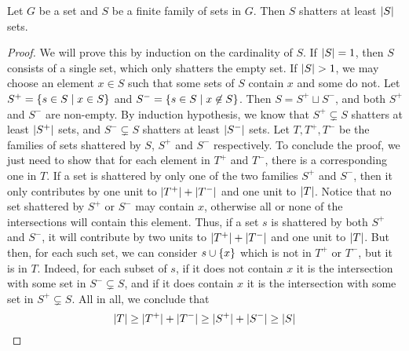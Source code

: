         \begin{lemma} \label{lem:pajor}
            Let $G$ be a set and $S$ be a finite family of sets in $G$.
            Then $S$ shatters at least $| S |$ sets.
            \begin{proof}
                We will prove this by induction on the cardinality of $S$.
                If $| S | = 1$, then $S$ consists of a single set, which only shatters the empty set.
                If $| S | > 1$, we may choose an element $x \in S$ such that some sets of $S$ contain $x$ and some do not.
                Let $S^+ = \{ s \in S \mid x \in S \}$ and $S^- = \{ s \in S \mid x \not\in S \}$.
                Then $S = S^+ \sqcup S^-$, and both $S^+$ and $S^-$ are non-empty.
                By induction hypothesis, we know that $S^+ \subsetneq S$ shatters at least $| S^+ |$ sets,
                and $S^- \subsetneq S$ shatters at least $| S^- |$ sets.
                Let $T, T^+, T^-$ be the families of sets shattered by $S$, $S^+$ and $S^-$ respectively.
                To conclude the proof, we just need to show that for each element in $T^+$ and $T^-$, there is a corresponding
                one in $T$.
                If a set is shattered by only one of the two families $S^+$ and $S^-$, then it only contributes by one unit
                to $| T^+ | + | T^- |$ and one unit to $| T |$.
                Notice that no set shattered by $S^+$ or $S^-$ may contain $x$, otherwise all or none of the intersections
                will contain this element.
                Thus, if a set $s$ is shattered by both $S^+$ and $S^-$, it will contribute by two units to
                $| T^+ | + | T^- |$ and one unit to $| T |$.
                But then, for each such set, we can consider $s \cup \{ x \}$ which is not in $T^+$ or $T^-$, but it is in $T$.
                Indeed, for each subset of $s$, if it does not contain $x$ it is the intersection with some
                set in $S^- \subsetneq S$, and if it does contain $x$ it is the intersection with some set in $S^+ \subsetneq S$.
                All in all, we conclude that
                \[
                    | T | \geq | T^+ | + | T^- | \geq | S^+ | + | S^- |
                                    \geq | S |
                \]
            \end{proof}
        \end{lemma}

